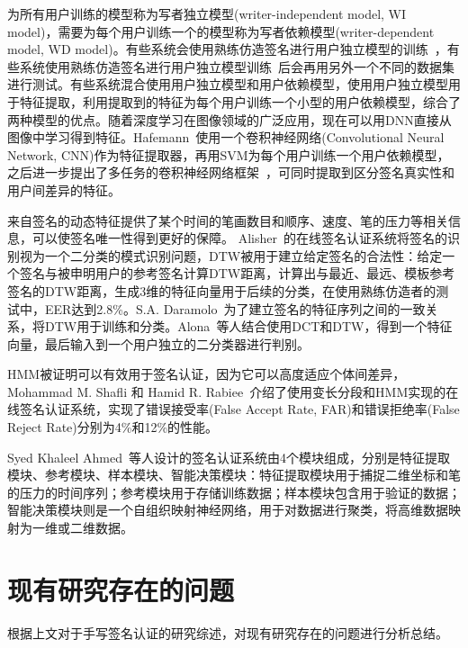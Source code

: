 为所有用户训练的模型称为写者独立模型(writer-independent model, WI model)，需要为每个用户训练一个的模型称为写者依赖模型(writer-dependent model, WD model)。有些系统会使用熟练仿造签名进行用户独立模型的训练~\cite{rivard2013multi,eskander2013hybrid}，有些系统使用熟练仿造签名进行用户独立模型训练~\cite{yilmaz2016score,rantzsch2016signature,hafemann2017learning}后会再用另外一个不同的数据集进行测试。有些系统混合使用用户独立模型和用户依赖模型，使用用户独立模型用于特征提取，利用提取到的特征为每个用户训练一个小型的用户依赖模型，综合了两种模型的优点。随着深度学习在图像领域的广泛应用，现在可以用DNN直接从图像中学习得到特征。Hafemann~\cite{hafemann2016writer}使用一个卷积神经网络(Convolutional Neural Network, CNN)作为特征提取器，再用SVM为每个用户训练一个用户依赖模型，之后进一步提出了多任务的卷积神经网络框架~\cite{hafemann2017learning}，可同时提取到区分签名真实性和用户间差异的特征。

来自签名的动态特征提供了某个时间的笔画数目和顺序、速度、笔的压力等相关信息，可以使签名唯一性得到更好的保障。 Alisher~\cite{kholmatov2005identity}的在线签名认证系统将签名的识别视为一个二分类的模式识别问题，DTW被用于建立给定签名的合法性：给定一个签名与被申明用户的参考签名计算DTW距离，计算出与最近、最远、模板参考签名的DTW距离，生成3维的特征向量用于后续的分类，在使用熟练仿造者的测试中，EER达到2.8\%。S.A. Daramolo~\cite{daramola2010efficient}为了建立签名的特征序列之间的一致关系，将DTW用于训练和分类。Alona~\cite{levy2018handwritten}等人结合使用DCT和DTW，得到一个特征向量，最后输入到一个用户独立的二分类器进行判别。

HMM被证明可以有效用于签名认证，因为它可以高度适应个体间差异，Mohammad M. Shafli 和 Hamid R. Rabiee~\cite{shafiei2003new}介绍了使用变长分段和HMM实现的在线签名认证系统，实现了错误接受率(False Accept Rate, FAR)和错误拒绝率(False Reject Rate)分别为4\%和12\%的性能。

Syed Khaleel Ahmed~\cite{ahmed2009automatic}等人设计的签名认证系统由4个模块组成，分别是特征提取模块、参考模块、样本模块、智能决策模块：特征提取模块用于捕捉二维坐标和笔的压力的时间序列；参考模块用于存储训练数据；样本模块包含用于验证的数据；智能决策模块则是一个自组织映射神经网络，用于对数据进行聚类，将高维数据映射为一维或二维数据。%

\section{现有研究存在的问题}
根据上文对于手写签名认证的研究综述，对现有研究存在的问题进行分析总结。

